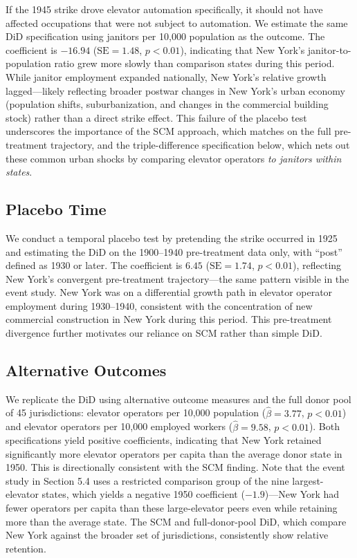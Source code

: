 \documentclass[12pt]{article}
\begin{document}
If the 1945 strike drove elevator automation specifically, it should not have affected occupations that were not subject to automation. We estimate the same DiD specification using janitors per 10,000 population as the outcome. The coefficient is $-16.94$ ($\text{SE} = 1.48$, $p < 0.01$), indicating that New York's janitor-to-population ratio grew more slowly than comparison states during this period. While janitor employment expanded nationally, New York's relative growth lagged---likely reflecting broader postwar changes in New York's urban economy (population shifts, suburbanization, and changes in the commercial building stock) rather than a direct strike effect. This failure of the placebo test underscores the importance of the SCM approach, which matches on the full pre-treatment trajectory, and the triple-difference specification below, which nets out these common urban shocks by comparing elevator operators \textit{to janitors within states}.

\subsection{Placebo Time}

We conduct a temporal placebo test by pretending the strike occurred in 1925 and estimating the DiD on the 1900--1940 pre-treatment data only, with ``post'' defined as 1930 or later. The coefficient is $6.45$ ($\text{SE} = 1.74$, $p < 0.01$), reflecting New York's convergent pre-treatment trajectory---the same pattern visible in the event study. New York was on a differential growth path in elevator operator employment during 1930--1940, consistent with the concentration of new commercial construction in New York during this period. This pre-treatment divergence further motivates our reliance on SCM rather than simple DiD.

\subsection{Alternative Outcomes}

We replicate the DiD using alternative outcome measures and the full donor pool of 45 jurisdictions: elevator operators per 10,000 population ($\hat{\beta} = 3.77$, $p < 0.01$) and elevator operators per 10,000 employed workers ($\hat{\beta} = 9.58$, $p < 0.01$). Both specifications yield positive coefficients, indicating that New York retained significantly more elevator operators per capita than the average donor state in 1950. This is directionally consistent with the SCM finding. Note that the event study in Section 5.4 uses a restricted comparison group of the nine largest-elevator states, which yields a negative 1950 coefficient ($-1.9$)---New York had fewer operators per capita than these large-elevator peers even while retaining more than the average state. The SCM and full-donor-pool DiD, which compare New York against the broader set of jurisdictions, consistently show relative retention.
\end{document}
